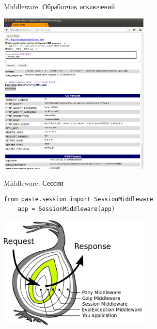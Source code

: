 \begin{frame}{Middleware. Обработчик исключений}
    \begin{center}
        \includegraphics[width=3in]{media/wsgi_example_error.png}
    \end{center}
\end{frame}

\begin{frame}[fragile]{Middleware. Сессии}
    \begin{lstlisting}[style=python]
    from paste.session import SessionMiddleware
    app = SessionMiddleware(app)
    \end{lstlisting}
    \begin{center}
        \includegraphics[width=3in]{media/wsgi_as_onion_session.png}
    \end{center}
\end{frame}

